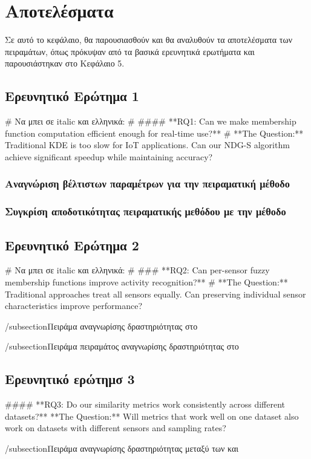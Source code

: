\chapter{Αποτελέσματα}

Σε αυτό το κεφάλαιο, θα παρουσιασθούν και θα αναλυθούν τα αποτελέσματα των πειραμάτων, όπως πρόκυψαν από τα βασικά ερευνητικά ερωτήματα και παρουσιάστηκαν στο Κεφάλαιο 5.

\section{Ερευνητικό Ερώτημα 1}

# Να μπει σε italic και ελληνικά:
# #### **RQ1: Can we make membership function computation efficient enough for real-time use?**
# **The Question:** Traditional KDE is too slow for IoT applications. Can our NDG-S algorithm achieve significant speedup while maintaining accuracy?

\subsection{Αναγνώριση βέλτιστων παραμέτρων για την πειραματική μέθοδο }

\subsection{Συγκρίση αποδοτικότητας πειραματικής μεθόδου  με την  μέθοδο }

\section{Ερευνητικό Ερώτημα 2}

# Να μπει σε italic και ελληνικά:
# ### **RQ2: Can per-sensor fuzzy membership functions improve activity recognition?**
# **The Question:** Traditional approaches treat all sensors equally. Can preserving individual sensor characteristics improve performance?

/subsection{Πειράμα αναγνωρίσης δραστηριότητας στο  }

/subsection{Πειράμα πειραμάτος αναγνωρίσης δραστηριότητας στο  }

\section{Ερευνητικό ερώτημσ 3}

#### **RQ3: Do our similarity metrics work consistently across different datasets?**
**The Question:** Will metrics that work well on one dataset also work on datasets with different sensors and sampling rates?

/subsection{Πειράμα αναγνωρίσης δραστηριότητας μεταξύ των  και  }